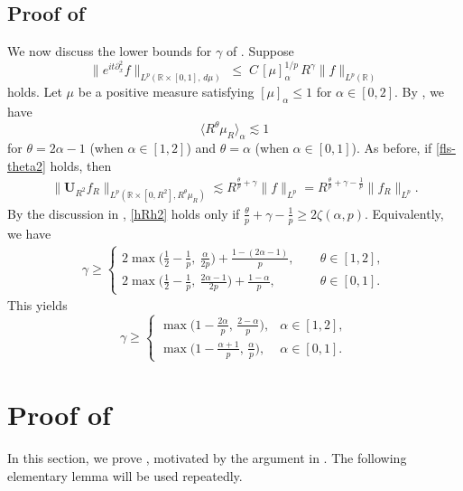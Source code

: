 \documentclass[11pt]{amsart}
\theoremstyle{definition}
\theoremstyle{remark}
\newcommand{\R}{\mathbb{R}}
\newcommand{\inn}[1]{\langle  #1 \rangle}
\begin{document}
\subsection{Proof of }
We now discuss the lower bounds for $\gamma$ of .
Suppose
\begin{equation}\label{fls-theta2}
  \big\| e^{it\partial_x^2}f \big\|_{L^p(\R\times[0,1],\,d\mu)}
  \;\le\; C\, [\mu]_{\alpha}^{1/p}\, R^\gamma\|f\|_{L^p(\R)}
\end{equation}
holds. Let $\mu$ be a positive measure satisfying $[\mu]_\alpha \le1$ for $\alpha\in[0,2]$.
By , we have
\[
\inn{R^\theta \mu_R}_\alpha \lesssim 1
\]
for $\theta=2\alpha-1$ (when $\alpha\in[1,2]$) and $\theta=\alpha$ (when $\alpha \in [0,1]$).
As before, if \eqref{fls-theta2} holds, then
\begin{align}\label{hRh2}
\big\|\mathbf U_{R^2} f_R\big\|_{L^p(\R\times [0,R^2],R^\theta\mu_R)}
\lesssim R^{\frac{\theta}p+\gamma}\|f\|_{L^p}
=R^{\frac{\theta}p+\gamma-\frac{1}{p}}\|f_R\|_{L^p}. 
\end{align}
By the discussion in , \eqref{hRh2} holds only if $\frac \theta p+\gamma-\frac1p\ge 2\zeta(\alpha,p)$. Equivalently, we have
\begin{align*}
\gamma \ge 
\begin{cases}
2\max\big(\frac12-\frac1p, ~\frac{\alpha}{2p}\big) +\frac{1-(2\alpha-1)}p, \quad~ &\theta\in[1,2],\\[1ex]
2\max\big(\frac12-\frac1p, ~\frac{2\alpha-1}{2p}\big) +\frac{1-\alpha}p, \quad~&\theta \in [0,1].
\end{cases}
\end{align*}
This yields
\[
  \gamma\ge
  \begin{cases}
  \max\!\big(1-\frac{2\alpha}{p},\,\frac{2-\alpha}{p}\big), & \alpha\in[1,2],\\[.8ex]
\max\!\big(1-\frac{\alpha+1}{p},\,\frac{\alpha}{p}\big), & \alpha\in[0,1].
  \end{cases}
\]


\appendix

\section{Proof of }\label{sec:pt}
In this section, we prove , motivated by the argument in \cite{BG}.
The following elementary lemma will be used repeatedly.
\end{document}
